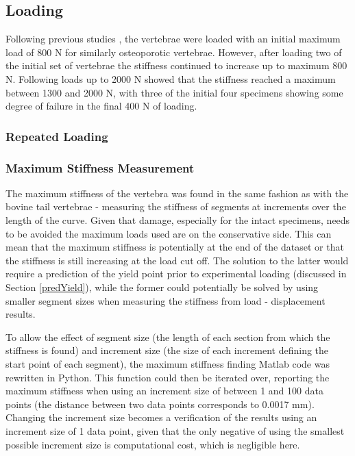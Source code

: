 \subsection{Loading}

Following previous studies \cite{Wijayathunga2008}, the vertebrae were loaded with an initial maximum load of 800 N for similarly osteoporotic vertebrae.
However, after loading two of the initial set of vertebrae the stiffness continued to increase up to maximum 800 N.
Following loads up to 2000 N showed that the stiffness reached a maximum between 1300 and 2000 N, with three of the initial four specimens showing some degree of failure in the final 400 N of loading.

\subsubsection{Repeated Loading}

\subsubsection{Maximum Stiffness Measurement}

The maximum stiffness of the vertebra was found in the same fashion as with the bovine tail vertebrae - measuring the stiffness of segments at increments over the length of the curve.
Given that damage, especially for the intact specimens, needs to be avoided the maximum loads used are on the conservative side.
This can mean that the maximum stiffness is potentially at the end of the dataset or that the stiffness is still increasing at the load cut off.
The solution to the latter would require a prediction of the yield point prior to experimental loading (discussed in Section \ref{predYield}), while the former could potentially be solved by using smaller segment sizes when measuring the stiffness from load - displacement results.

To allow the effect of segment size (the length of each section from which the stiffness is found) and increment size (the size of each increment defining the start point of each segment), the maximum stiffness finding Matlab code was rewritten in Python.
This function could then be iterated over, reporting the maximum stiffness when using an increment size of between 1 and 100 data points (the distance between two data points corresponds to 0.0017 mm).
Changing the increment size becomes a verification of the results using an increment size of 1 data point, given that the only negative of using the smallest possible increment size is computational cost, which is negligible here.

